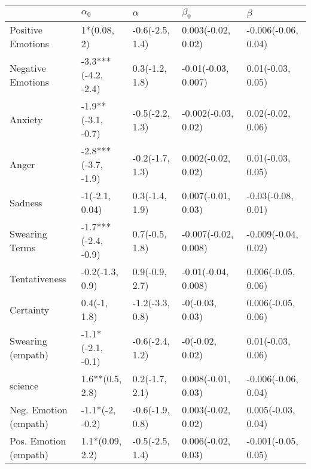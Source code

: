 \begin{tabular}{lllll}
\toprule
{} &           $\alpha_0$ &         $\alpha$ &             $\beta_0$ &              $\beta$ \\
\midrule
Positive Emotions     &          1*(0.08, 2) &  -0.6(-2.5, 1.4) &    0.003(-0.02, 0.02) &  -0.006(-0.06, 0.04) \\
Negative Emotions     &  -3.3***(-4.2, -2.4) &   0.3(-1.2, 1.8) &   -0.01(-0.03, 0.007) &    0.01(-0.03, 0.05) \\
Anxiety               &   -1.9**(-3.1, -0.7) &  -0.5(-2.2, 1.3) &   -0.002(-0.03, 0.02) &    0.02(-0.02, 0.06) \\
Anger                 &  -2.8***(-3.7, -1.9) &  -0.2(-1.7, 1.3) &    0.002(-0.02, 0.02) &    0.01(-0.03, 0.05) \\
Sadness               &       -1(-2.1, 0.04) &   0.3(-1.4, 1.9) &    0.007(-0.01, 0.03) &   -0.03(-0.08, 0.01) \\
Swearing Terms        &  -1.7***(-2.4, -0.9) &   0.7(-0.5, 1.8) &  -0.007(-0.02, 0.008) &  -0.009(-0.04, 0.02) \\
Tentativeness         &      -0.2(-1.3, 0.9) &   0.9(-0.9, 2.7) &   -0.01(-0.04, 0.008) &   0.006(-0.05, 0.06) \\
Certainty             &         0.4(-1, 1.8) &  -1.2(-3.3, 0.8) &       -0(-0.03, 0.03) &   0.006(-0.05, 0.06) \\
Swearing (empath)     &    -1.1*(-2.1, -0.1) &  -0.6(-2.4, 1.2) &       -0(-0.02, 0.02) &    0.01(-0.03, 0.06) \\
science               &      1.6**(0.5, 2.8) &   0.2(-1.7, 2.1) &    0.008(-0.01, 0.03) &  -0.006(-0.06, 0.04) \\
Neg. Emotion (empath) &      -1.1*(-2, -0.2) &  -0.6(-1.9, 0.8) &    0.003(-0.02, 0.02) &   0.005(-0.03, 0.04) \\
Pos. Emotion (empath) &      1.1*(0.09, 2.2) &  -0.5(-2.5, 1.4) &    0.006(-0.02, 0.03) &  -0.001(-0.05, 0.05) \\
\bottomrule
\end{tabular}
